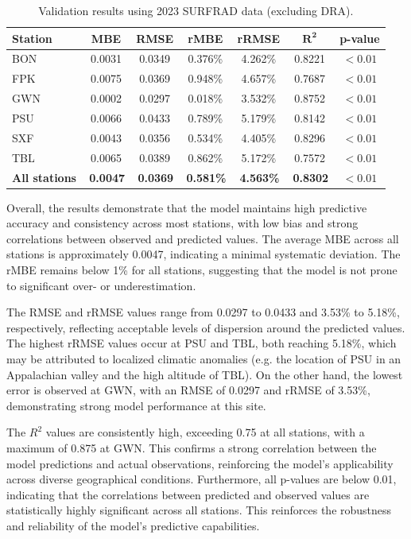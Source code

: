 \documentclass[preprint,12pt]{elsarticle}
\begin{document}
\begin{table}[htbp]
\centering
\caption{Validation results using 2023 SURFRAD data (excluding DRA).}
\label{tab:validation}
\begin{tabular}{lcccccc}
\hline
\textbf{Station} & \textbf{MBE} & \textbf{RMSE} & \textbf{rMBE} & \textbf{rRMSE} & $\mathbf{R^2}$ & \textbf{p-value} \\
\hline
BON  & 0.0031  & 0.0349  & 0.376\% & 4.262\% & 0.8221  & $< 0.01$ \\
FPK  & 0.0075  & 0.0369  & 0.948\% & 4.657\% & 0.7687  & $< 0.01$ \\
GWN  & 0.0002  & 0.0297  & 0.018\% & 3.532\% & 0.8752  & $< 0.01$ \\
PSU  & 0.0066  & 0.0433  & 0.789\% & 5.179\% & 0.8142  & $< 0.01$ \\
SXF  & 0.0043  & 0.0356  & 0.534\% & 4.405\% & 0.8296  & $< 0.01$ \\
TBL  & 0.0065  & 0.0389  & 0.862\% & 5.172\% & 0.7572  & $< 0.01$ \\
\textbf{All stations} & \textbf{\,0.0047} & \textbf{\,0.0369} & \textbf{\,0.581\%} & \textbf{\,4.563\%} & \textbf{\,0.8302} & \textbf{$< 0.01$} \\
\hline
\end{tabular}
\end{table}

Overall, the results demonstrate that the model maintains high predictive accuracy and consistency across most stations, with low bias and strong correlations between observed and predicted values. The average MBE across all stations is approximately 0.0047, indicating a minimal systematic deviation. The rMBE remains below 1\% for all stations, suggesting that the model is not prone to significant over- or underestimation.

The RMSE and rRMSE values range from 0.0297 to 0.0433 and 3.53\% to 5.18\%, respectively, reflecting acceptable levels of dispersion around the predicted values. The highest rRMSE values occur at PSU and TBL, both reaching 5.18\%, which may be attributed to localized climatic anomalies (e.g. the location of PSU in an Appalachian valley and the high altitude of TBL). On the other hand, the lowest error is observed at GWN, with an RMSE of 0.0297 and rRMSE of 3.53\%, demonstrating strong model performance at this site.

The $R^2$ values are consistently high, exceeding 0.75 at all stations, with a maximum of 0.875 at GWN. This confirms a strong correlation between the model predictions and actual observations, reinforcing the model's applicability across diverse geographical conditions. Furthermore, all p-values are below 0.01, indicating that the correlations between predicted and observed values are statistically highly significant across all stations. This reinforces the robustness and reliability of the model's predictive capabilities.
\end{document}
